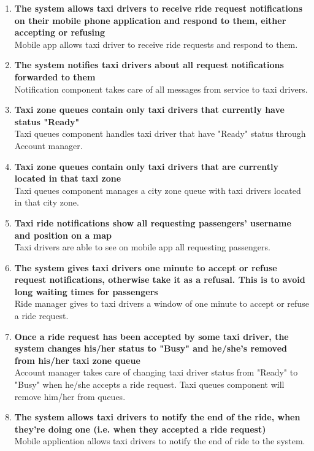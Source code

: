 \begin{enumerate}
	\item \textbf{The system allows taxi drivers to receive ride request notifications on their mobile phone application and respond to them, either accepting or refusing}\\
	Mobile app allows taxi driver to receive ride requests and respond to them.
	
	\item \textbf{The system notifies taxi drivers about all request notifications forwarded to them}\\
	Notification component takes care of all messages from service to taxi drivers.
	
	\item \textbf{Taxi zone queues contain only taxi drivers that currently have status "Ready"}\\
	Taxi queues component handles taxi driver that have "Ready" status through Account manager.
	
	\item \textbf{Taxi zone queues contain only taxi drivers that are currently located in that taxi zone}\\
	Taxi queues component manages a city zone queue with taxi drivers located in that city zone.
	
	\item \textbf{Taxi ride notifications show all requesting passengers' username and position on a map}\\
	Taxi drivers are able to see on mobile app all requesting passengers.
	
	\item \textbf{The system gives taxi drivers one minute to accept or refuse request notifications, otherwise take it as a refusal. This is to avoid long waiting times for passengers}\\
	Ride manager gives to taxi drivers a window of one minute to accept or refuse a ride request.
	
	\item \textbf{Once a ride request has been accepted by some taxi driver, the system changes his/her status to "Busy" and he/she's removed from his/her taxi zone queue}\\
	Account manager takes care of changing taxi driver status from "Ready" to "Busy" when he/she accepts a ride request. Taxi queues component will remove him/her from queues.
	
	\item \textbf{The system allows taxi drivers to notify the end of the ride, when they're doing one (i.e. when they accepted a ride request)}\\
	Mobile application allows taxi drivers to notify the end of ride to the system.
	

\end{enumerate}
